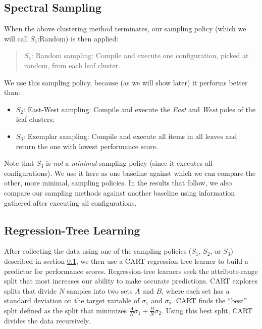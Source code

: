 \documentclass{newsig}
\newcommand{\bi}{\begin{itemize}}%
\newcommand{\ei}{\end{itemize}}
\begin{document}
\subsection{Spectral Sampling}\label{sect:sample}
When the above clustering method terminates, our  sampling policy (which we will call $S_1$:Random) is then applied:
\begin{quote}
$S_1$: Random sampling: Compile and execute one  configuration,  picked at random, from each leaf cluster.
\end{quote}
We use this sampling policy, because (as we will show later) it performs better than:
\bi
\item $S_2$: East-West sampling: Compile and execute the {\em East} and {\em West} poles of the leaf clusters;
\item $S_3$: Exemplar sampling: Compile and execute all items in all leaves and return the one
with lowest performance score.
\ei
Note that $S_3$ is {\em not} a {\em minimal} sampling policy (since it executes all configurations). 
We use it here as one  baseline
against which we can compare the other, more minimal, sampling policies. In the results
that follow, we also compare our 
sampling methods against another baseline using information gathered after executing
all configurations.

\subsection{Regression-Tree Learning}
After collecting the data using one of the sampling policies ($S_1$, $S_2$, or $S_3$) described in section \ref{sect:sample}, we then use a CART regression-tree learner \cite{breiman1984} to build a predictor for performance scores. Regression-tree learners seek the attribute-range split that most increases
our ability to make accurate predictions.
CART explores splits that divide $N$ samples  into two sets  $A$ and $B$, where each set  has a  standard deviation on the target variable of $\sigma_1$ and  $\sigma_2$.
CART finds the ``best'' split defined as the split that minimizes $\frac{A}{N}\sigma_1 + \frac{B}{N}\sigma_2$.
Using this best split, CART divides the data recursively.
 
\end{document}
